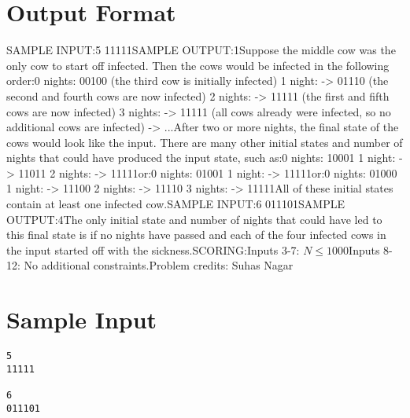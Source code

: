 \documentclass[12pt]{article}
\begin{document}
\section*{Output Format}
SAMPLE INPUT:5
11111SAMPLE OUTPUT:1Suppose the middle cow was the only cow to start off infected. Then the cows 
would be infected in the following order:0 nights:    00100 (the third cow is initially infected)
1 night:  -> 01110 (the second and fourth cows are now infected)
2 nights: -> 11111 (the first and fifth cows are now infected)
3 nights: -> 11111 (all cows already were infected, so no additional cows are infected)
          -> ...After two or more nights, the final state of the cows would look like the input.
There are many other initial states and number of nights that could have
produced the input state, such as:0 nights:    10001
1 night:  -> 11011
2 nights: -> 11111or:0 nights:    01001
1 night:  -> 11111or:0 nights:    01000
1 night:  -> 11100
2 nights: -> 11110
3 nights: -> 11111All of these initial states contain at least one infected cow.SAMPLE INPUT:6
011101SAMPLE OUTPUT:4The only initial state and number of nights that could have led to this final
state is if no nights have passed and each of the four infected cows in the
input started off with the sickness.SCORING:Inputs 3-7: $N \le 1000$Inputs 8-12: No additional constraints.Problem credits: Suhas Nagar

\section*{Sample Input}
\begin{verbatim}
5
11111

6
011101
\end{verbatim}
\end{document}
